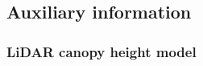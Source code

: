 
% 






\newpage
\subsection{Auxiliary information}
\label{sec:auxinfo}

\subsubsection{LiDAR canopy height model}
\label{sec:chm}

